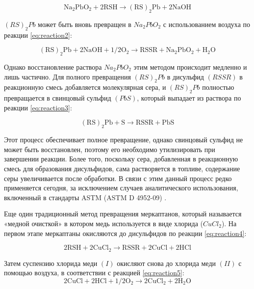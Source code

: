 \begin{equation}
	\mathrm{Na_2PbO_2 + 2RSH \rightarrow {(RS)_2Pb} + 2NaOH} \label{eq:reaction1}
\end{equation}

$(RS)_2Pb$ может быть вновь превращен в $Na_2PbO_2$ с использованием воздуха по реакции \cref{eq:reaction2}: 

\begin{equation}
	\mathrm{(RS)_2Pb + 2NaOH + 1/2O_2 \rightarrow RSSR + Na_2PbO_2 + H_2O} \label{eq:reaction2} 
\end{equation} 

Однако восстановление раствора $Na_2PbO_2$ этим методом происходит медленно и лишь частично. Для полного превращения $(RS)_2Pb$ в дисульфид $(RSSR)$ в реакционную смесь добавляется молекулярная сера, и $(RS)_2Pb$ полностью превращается в свинцовый сульфид $(PbS)$, который выпадает из раствора по реакции \cref{eq:reaction3}:

\begin{equation}
	\mathrm{(RS)_2Pb + S \rightarrow RSSR + PbS} \label{eq:reaction3}
\end{equation} 

Этот процесс обеспечивает полное превращение, однако свинцовый сульфид не может быть восстановлен, поэтому его необходимо утилизировать при завершении реакции. Более того, поскольку сера, добавленная в реакционную смесь для образования дисульфидов, сама растворяется в топливе, содержание серы увеличивается после обработки. В связи с этим данный процесс редко применяется сегодня, за исключением случаев аналитического использования, включенный в стандарты ASTM (ASTM D 4952-09) \cite{noauthor_doctor_nodate}.

Еще один традиционный метод превращения меркаптанов, который называется «медной очисткой» в котором медь используется в виде хлорида ($CuCl_2$). На первом этапе меркаптаны окисляются до дисульфидов по реакции \cref{eq:reaction4}:

\begin{equation}	
	\mathrm{2RSH + 2CuCl_2 \rightarrow RSSR + 2CuCl + 2HCl} \label{eq:reaction4}
\end{equation}

Затем суспензию хлорида меди $(I)$ окисляют снова до хлорида меди $(II)$ с помощью воздуха, в соответствии с реакцией \cref{eq:reaction5}:
\begin{equation}	
	\mathrm{2CuCl + 2HCl + 1/2O_2 \rightarrow 2CuCl_2 + 2H_2O} \label{eq:reaction5}
\end{equation}

